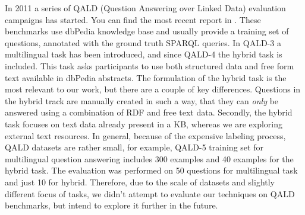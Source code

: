 In 2011 a series of QALD (Question Answering over Linked Data) evaluation campaigns has started.
You can find the most recent report in \cite{UngerFLNCCW15}.
These benchmarks use dbPedia knowledge base and usually provide a training set of questions, annotated with the ground truth SPARQL queries.
In QALD-3 a multilingual task has been introduced, and since QALD-4 the hybrid task is included.
This task asks participants to use both structured data and free form text available in dbPedia abstracts.
The formulation of the hybrid task is the most relevant to our work, but there are a couple of key differences.
Questions in the hybrid track are manually created in such a way, that they can \textit{only} be answered using a combination of RDF and free text data.
Secondly, the hybrid task focuses on text data already present in a KB, whereas we are exploring external text resources.
In general, because of the expensive labeling process, QALD datasets are rather small, for example, QALD-5 training set for multilingual question answering includes 300 examples and 40 examples for the hybrid task.
The evaluation was performed on 50 questions for multilingual task and just 10 for hybrid.
Therefore, due to the scale of datasets and slightly different focus of tasks, we didn't attempt to evaluate our techniques on QALD benchmarks, but intend to explore it further in the future.

